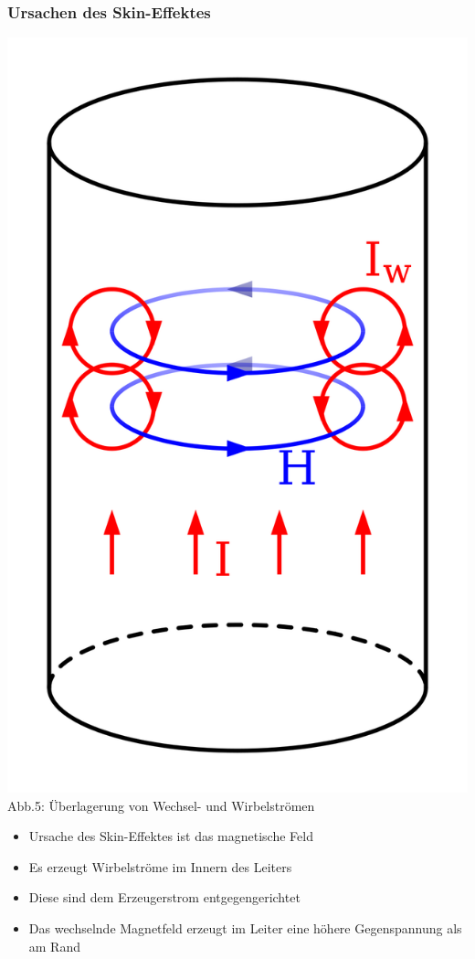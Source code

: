 \begin{frame}
	\frametitle{Ursachen des Skin-Effektes}
	  \begin{center}
	 	\includegraphics[scale=0.06]{a02/Skineffect.png}\\
 			\small{Abb.5: Überlagerung von Wechsel- und Wirbelströmen \cite{wp}}
 		\begin{itemize}
 			\item Ursache des Skin-Effektes ist das magnetische Feld
 			\item Es erzeugt Wirbelströme im Innern des Leiters
 			\item Diese sind dem Erzeugerstrom entgegengerichtet
 			\item Das wechselnde Magnetfeld erzeugt im Leiter eine höhere Gegenspannung als am Rand 
 		\end{itemize}
  \end{center}
\end{frame}

